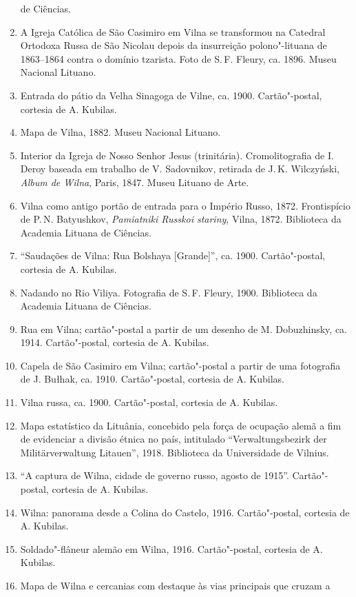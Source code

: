 \begin{enumerate}
  de Ciências.
\item
  A Igreja Católica de São Casimiro em Vilna se transformou na Catedral
  Ortodoxa Russa de São Nicolau depois da insurreição polono"-lituana de
  1863--1864 contra o domínio tzarista. Foto de S.\,F. Fleury, ca. 1896.
  Museu Nacional Lituano.
\item
  Entrada do pátio da Velha Sinagoga de Vilne, ca. 1900. Cartão"-postal,
  cortesia de A. Kubilas.
\item
  Mapa de Vilna, 1882. Museu Nacional Lituano.
\item
  Interior da Igreja de Nosso Senhor Jesus (trinitária). Cromolitografia
  de I. Deroy baseada em trabalho de V. Sadovnikov, retirada de J.\,K.
  Wilczyński, \emph{Album de Wilna}, Paris, 1847. Museu Lituano de Arte.
\item
  Vilna como antigo portão de entrada para o Império Russo, 1872.
  Frontispício de P.\,N. Batyushkov, \emph{Pamiatniki Russkoi stariny},
  Vilna, 1872. Biblioteca da Academia Lituana de Ciências.
\item
  ``Saudações de Vilna: Rua Bolshaya {[}Grande{]}'', ca. 1900.
  Cartão"-postal, cortesia de A. Kubilas.
\item
  Nadando no Rio Viliya. Fotografia de S.\,F. Fleury, 1900. Biblioteca da
  Academia Lituana de Ciências.
\item
  Rua em Vilna; cartão"-postal a partir de um desenho de M. Dobuzhinsky,
  ca. 1914. Cartão"-postal, cortesia de A. Kubilas.
\item
  Capela de São Casimiro em Vilna; cartão"-postal a partir de uma
  fotografia de J. Bułhak, ca. 1910. Cartão"-postal, cortesia de A.
  Kubilas.
\item
  Vilna russa, ca. 1900. Cartão"-postal, cortesia de A. Kubilas.
\item
  Mapa estatístico da Lituânia, concebido pela força de ocupação alemã a
  fim de evidenciar a divisão étnica no país, intitulado
  ``Verwaltungsbezirk der Militärverwaltung Litauen'', 1918. Biblioteca
  da Universidade de Vilnius.
\item
  ``A captura de Wilna, cidade de governo russo, agosto de 1915''.
  Cartão"-postal, cortesia de A. Kubilas.
\item
  Wilna: panorama desde a Colina do Castelo, 1916. Cartão"-postal,
  cortesia de A. Kubilas.
\item
  Soldado"-flâneur alemão em Wilna, 1916. Cartão"-postal, cortesia de A.
  Kubilas.
\item
  Mapa de Wilna e cercanias com destaque às vias principais que cruzam a

\end{enumerate}
